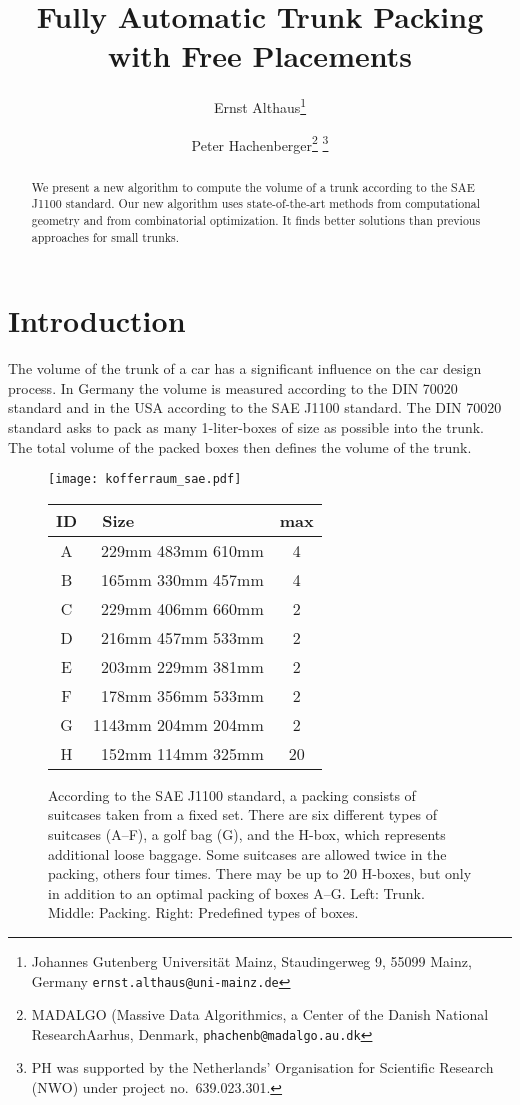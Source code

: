 \documentclass{article}
\newcounter{algo}
\begin{document}
\title{Fully Automatic Trunk Packing with Free Placements}
\author{Ernst Althaus\thanks{Johannes Gutenberg Universit\"at Mainz, Staudingerweg 9, 55099 Mainz, Germany
{\tt ernst.althaus@uni-mainz.de}} \and Peter
Hachenberger\thanks{MADALGO (Massive Data Algorithmics, a Center of the Danish National ResearchAarhus, Denmark, {\tt phachenb@madalgo.au.dk}}
\thanks{PH was supported by the
Netherlands' Organisation for Scientific Research (NWO) under project
no.~639.023.301.}}




\maketitle

\begin{abstract}
We present a new algorithm to compute the volume of a trunk according
to the SAE J1100 standard. Our new algorithm uses state-of-the-art
methods from computational geometry and from combinatorial
optimization. It finds better solutions than previous approaches for
small trunks.
\end{abstract}

\section{Introduction}
\label{sec:introduction}

The volume of the trunk of a car has a significant influence on the
car design process. In Germany the volume is measured according to the
DIN 70020 standard and in the USA according to the SAE J1100 standard.
The DIN 70020 standard asks to pack as many 1-liter-boxes of size
 as possible into the trunk. The total
volume of the packed boxes then defines the volume of the trunk.

\begin{figure}[t]
\center
\texttt{[image: kofferraum\_sae.pdf]}
\hfill
\begin{tabular}[b]{|c|r|c|}
\hline
ID & \multicolumn{1}{|l|}{\ Size} & max \\
\hline
A & 229mm  483mm  610mm & 4 \\
B & 165mm  330mm  457mm & 4 \\
C & 229mm  406mm  660mm & 2 \\
D & 216mm  457mm  533mm & 2 \\
E & 203mm  229mm  381mm & 2 \\
F & 178mm  356mm  533mm & 2 \\
\hline
G & 1143mm  204mm  204mm & 2 \\
\hline
H & 152mm  114mm  325mm & 20 \\
\hline
\end{tabular}
\caption{
\label{fig:boxset}
According to the SAE J1100 standard, a packing consists of suitcases
taken from a fixed set. There are six different types of suitcases
(A--F), a golf bag (G), and the H-box, which represents additional
loose baggage. Some suitcases are allowed twice in the packing, others
four times. There may be up to 20 H-boxes, but only in addition to an
optimal packing of boxes A--G. Left: Trunk. Middle: Packing. Right:
Predefined types of boxes.}
\end{figure}
\end{document}
